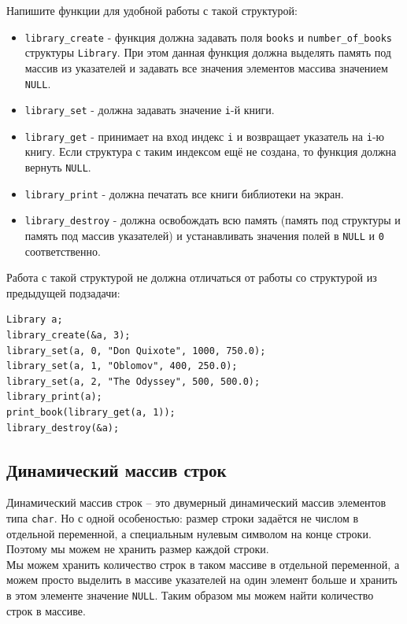 \documentclass[10pt]{article}
\begin{document}
\begin{enumerate}
Напишите функции для удобной работы с такой структурой:
\begin{itemize}
\item \texttt{library\_create} - функция должна задавать поля \texttt{books} и \texttt{number\_of\_books} структуры \texttt{Library}. При этом данная функция должна выделять память под массив из указателей и задавать все значения элементов массива значением \texttt{NULL}.
\item \texttt{library\_set} - должна задавать значение \texttt{i}-й книги.
\item \texttt{library\_get} - принимает на вход индекс \texttt{i} и возвращает указатель на \texttt{i}-ю книгу. Если структура с таким индексом ещё не создана, то функция должна вернуть \texttt{NULL}.
\item \texttt{library\_print} - должна печатать все книги библиотеки на экран.
\item \texttt{library\_destroy} - должна освобождать всю память (память под структуры и память под массив указателей) и устанавливать значения полей в \texttt{NULL} и \texttt{0} соответственно.
\end{itemize}

Работа с такой структурой не должна отличаться от работы со структурой из предыдущей подзадачи:
\begin{lstlisting}
Library a;
library_create(&a, 3);
library_set(a, 0, "Don Quixote", 1000, 750.0);
library_set(a, 1, "Oblomov", 400, 250.0);
library_set(a, 2, "The Odyssey", 500, 500.0);
library_print(a);
print_book(library_get(a, 1));
library_destroy(&a);
\end{lstlisting}
\fi
\end{enumerate}

\newpage
\subsection{Динамический массив строк}
Динамический массив строк -- это двумерный динамический массив элементов типа \texttt{char}. 
Но с одной особеностью: размер строки задаётся не числом в отдельной переменной, а специальным нулевым символом на конце строки. Поэтому мы можем не хранить размер каждой строки. \\
Мы можем хранить количество строк в таком массиве в отдельной переменной, а можем просто выделить в массиве указателей на один элемент больше и хранить в этом элементе значение \texttt{NULL}. Таким образом мы можем найти количество строк в массиве.\\
\end{document}
